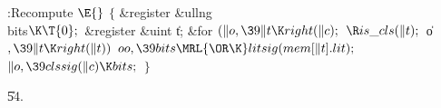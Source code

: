 \B{}:Recompute \X${}\E{}$\6
${}\{{}$\1\6
\&{register} \&{ullng} \\{bits}${}\K\T{0};{}$\6
\&{register} \&{uint} \|t;\7
\&{for} ${}(\|o,\39\|t\K\\{right}(\|c);{}$ ${}\R\\{is\_cls}(\|t);{}$ \|o${},\39%
\|t\K\\{right}(\|t)){}$\1\5
${}\\{oo},\39\\{bits}\MRL{{\OR}{\K}}\\{litsig}(\\{mem}[\|t].\\{lit});{}$\2\6
${}\|o,\39\\{clssig}(\|c)\K\\{bits};{}$\6
\4${}\}{}$\2\par
\U54.\fi

